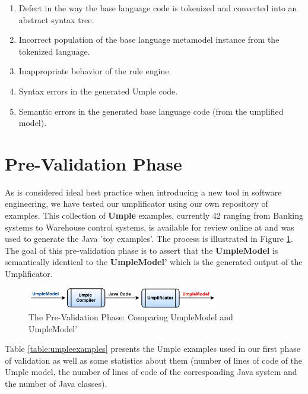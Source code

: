 \begin{enumerate}
\item Defect in the way the base language code is tokenized and converted into an abstract syntax tree.
\item Incorrect population of the base language metamodel instance from the tokenized language.
\item Inappropriate behavior of the rule engine.
\item Syntax errors in the generated Umple code.
\item Semantic errors in the generated base language code (from the umplified model).
\end{enumerate}

\section{Pre-Validation Phase}


As is considered ideal best practice when introducing a new tool in software engineering, we have tested our umplificator using our own repository of examples. This collection of \textbf{Umple} examples, currently 42 ranging from Banking systems to Warehouse control systems, is available for review online at \cite{umpleexamples} and was used to generate the Java 'toy examples'.
The process is illustrated in Figure \ref{fig:preValidation}. The goal of this pre-validation phase is to assert that the \textbf{UmpleModel} is semantically identical to the \textbf{UmpleModel'} which is the generated output of the Umplificator.
 
\begin{figure}[h]
\centering
\includegraphics[width=0.75\textwidth]{Figures/preValidation.png} 
\caption{The Pre-Validation Phase: Comparing UmpleModel and UmpleModel'}
\label{fig:preValidation}
\end{figure}

Table \ref{table:umpleexamples} presents the Umple examples used in our first phase of validation as well as  some statistics about them (number of lines of code of the Umple model, the number of lines of code of the corresponding Java system and the number of Java classes).


